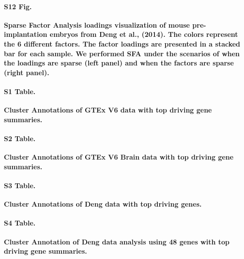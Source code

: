 \documentclass[10pt,letterpaper]{article}
\begin{document}
\paragraph*{S12 Fig.}
\label{figS12}
\textbf{Sparse Factor Analysis loadings visualization of mouse pre-implantation
embryos from Deng et al., (2014). The colors represent the 6 different factors. The factor loadings are presented in a stacked bar for each sample. We performed SFA under the scenarios of when the loadings are sparse (left panel) and when the factors are sparse (right panel).}

\paragraph*{S1 Table.}
\label{supptab1}
\textbf{ Cluster Annotations of GTEx V6 data with top driving gene summaries.}

\paragraph*{S2 Table.}
\label{supptab2}
\textbf{ Cluster Annotations of GTEx V6 Brain data with top driving gene summaries.}

\paragraph*{S3 Table.}
\label{supptab3}
{\bf Cluster Annotations of Deng data with top driving genes.}

\paragraph*{S4 Table.}
\label{supptab3}
\textbf{ Cluster Annotation of Deng data analysis using 48 genes with top driving gene summaries.}


\end{document}
